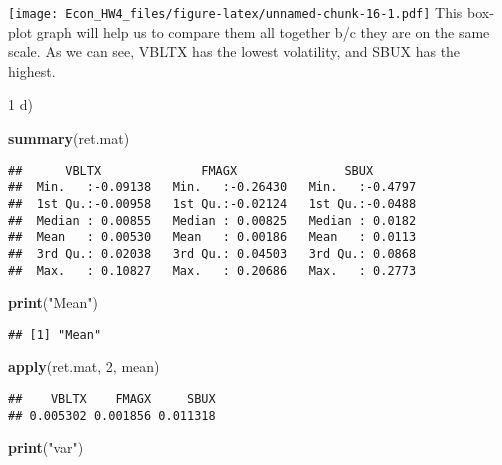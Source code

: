 \documentclass[]{article}
\newenvironment{Shaded}{\begin{snugshade}}{\end{snugshade}}
\newcommand{\KeywordTok}[1]{\textcolor[rgb]{0.13,0.29,0.53}{\textbf{#1}}}
\newcommand{\DecValTok}[1]{\textcolor[rgb]{0.00,0.00,0.81}{#1}}
\newcommand{\StringTok}[1]{\textcolor[rgb]{0.31,0.60,0.02}{#1}}
\newcommand{\NormalTok}[1]{#1}
\begin{document}
\texttt{[image: Econ\_HW4\_files/figure-latex/unnamed-chunk-16-1.pdf]}
This box-plot graph will help us to compare them all together b/c they
are on the same scale. As we can see, VBLTX has the lowest volatility,
and SBUX has the highest.

1 d)

\begin{Shaded}
\begin{Highlighting}[]
\KeywordTok{summary}\NormalTok{(ret.mat)}
\end{Highlighting}
\end{Shaded}

\begin{verbatim}
##      VBLTX              FMAGX               SBUX        
##  Min.   :-0.09138   Min.   :-0.26430   Min.   :-0.4797  
##  1st Qu.:-0.00958   1st Qu.:-0.02124   1st Qu.:-0.0488  
##  Median : 0.00855   Median : 0.00825   Median : 0.0182  
##  Mean   : 0.00530   Mean   : 0.00186   Mean   : 0.0113  
##  3rd Qu.: 0.02038   3rd Qu.: 0.04503   3rd Qu.: 0.0868  
##  Max.   : 0.10827   Max.   : 0.20686   Max.   : 0.2773
\end{verbatim}

\begin{Shaded}
\begin{Highlighting}[]
\KeywordTok{print}\NormalTok{(}\StringTok{"Mean"}\NormalTok{)}
\end{Highlighting}
\end{Shaded}

\begin{verbatim}
## [1] "Mean"
\end{verbatim}

\begin{Shaded}
\begin{Highlighting}[]
\KeywordTok{apply}\NormalTok{(ret.mat, }\DecValTok{2}\NormalTok{, mean)}
\end{Highlighting}
\end{Shaded}

\begin{verbatim}
##    VBLTX    FMAGX     SBUX 
## 0.005302 0.001856 0.011318
\end{verbatim}

\begin{Shaded}
\begin{Highlighting}[]
\KeywordTok{print}\NormalTok{(}\StringTok{"var"}\NormalTok{)}
\end{Highlighting}
\end{Shaded}
\end{document}
